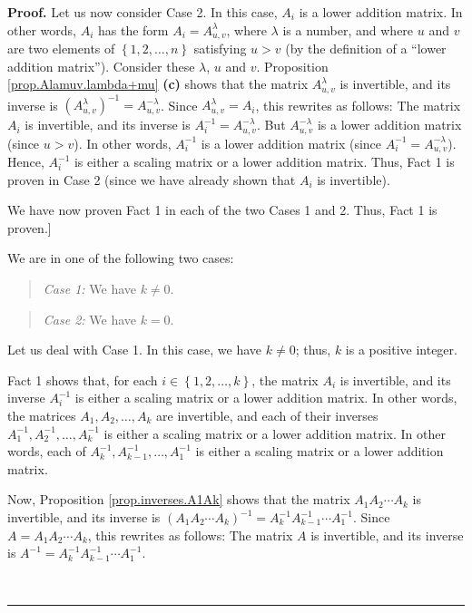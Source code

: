 \documentclass[numbers=enddot,12pt,final,onecolumn,notitlepage]{scrartcl}%
\theoremstyle{definition}
\newenvironment{statement}{\begin{quote}}{\end{quote}}
\newenvironment{proof}[1][Proof]{\noindent\textbf{#1.} }{\ \rule{0.5em}{0.5em}}
\begin{document}
\begin{proof}
Let us now consider Case 2. In this case, $A_{i}$ is a lower addition matrix.
In other words, $A_{i}$ has the form $A_{i}=A_{u,v}^{\lambda}$, where
$\lambda$ is a number, and where $u$ and $v$ are two elements of $\left\{
1,2,\ldots,n\right\}  $ satisfying $u>v$ (by the definition of a
\textquotedblleft lower addition matrix\textquotedblright). Consider these
$\lambda$, $u$ and $v$. Proposition \ref{prop.Alamuv.lambda+mu} \textbf{(c)}
shows that the matrix $A_{u,v}^{\lambda}$ is invertible, and its inverse is
$\left(  A_{u,v}^{\lambda}\right)  ^{-1}=A_{u,v}^{-\lambda}$. Since
$A_{u,v}^{\lambda}=A_{i}$, this rewrites as follows: The matrix $A_{i}$ is
invertible, and its inverse is $A_{i}^{-1}=A_{u,v}^{-\lambda}$. But
$A_{u,v}^{-\lambda}$ is a lower addition matrix (since $u>v$). In other words,
$A_{i}^{-1}$ is a lower addition matrix (since $A_{i}^{-1}=A_{u,v}^{-\lambda}%
$). Hence, $A_{i}^{-1}$ is either a scaling matrix or a lower addition matrix.
Thus, Fact 1 is proven in Case 2 (since we have already shown that $A_{i}$ is invertible).

We have now proven Fact 1 in each of the two Cases 1 and 2. Thus, Fact 1 is proven.]

We are in one of the following two cases:

\begin{statement}
\textit{Case 1:} We have $k\neq0$.
\end{statement}

\begin{statement}
\textit{Case 2:} We have $k=0$.
\end{statement}

Let us deal with Case 1. In this case, we have $k\neq0$; thus, $k$ is a
positive integer.

Fact 1 shows that, for each $i\in\left\{  1,2,\ldots,k\right\}  $, the matrix
$A_{i}$ is invertible, and its inverse $A_{i}^{-1}$ is either a scaling matrix
or a lower addition matrix. In other words, the matrices $A_{1},A_{2}%
,\ldots,A_{k}$ are invertible, and each of their inverses $A_{1}^{-1}%
,A_{2}^{-1},\ldots,A_{k}^{-1}$ is either a scaling matrix or a lower addition
matrix. In other words, each of $A_{k}^{-1},A_{k-1}^{-1},\ldots,A_{1}^{-1}$ is
either a scaling matrix or a lower addition matrix.

Now, Proposition \ref{prop.inverses.A1Ak} shows that the matrix $A_{1}%
A_{2}\cdots A_{k}$ is invertible, and its inverse is $\left(  A_{1}A_{2}\cdots
A_{k}\right)  ^{-1}=A_{k}^{-1}A_{k-1}^{-1}\cdots A_{1}^{-1}$. Since
$A=A_{1}A_{2}\cdots A_{k}$, this rewrites as follows: The matrix $A$ is
invertible, and its inverse is $A^{-1}=A_{k}^{-1}A_{k-1}^{-1}\cdots A_{1}%
^{-1}$.


\end{proof}
\end{document}
